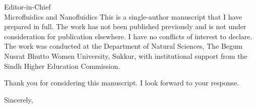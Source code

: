 \documentclass[11pt]{letter}
\begin{document}
\begin{letter}{
Editor-in-Chief\\
Microfluidics and Nanofluidics
}
This is a single-author manuscript that I have prepared in full.
The work has not been published previously and is not under
consideration for publication elsewhere. I have no conflicts of
interest to declare. The work was conducted at the Department of
Natural Sciences, The Begum Nusrat Bhutto Women University,
Sukkur, with institutional support from the Sindh Higher Education
Commission.

Thank you for considering this manuscript. I look forward to your
response.

\closing{Sincerely,}

\end{letter}
\end{document}
